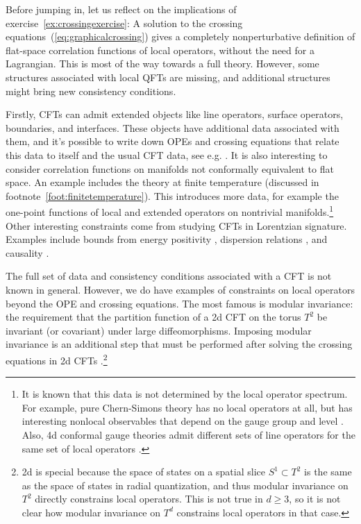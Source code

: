 \documentclass{ws-rv9x6}
\newcommand\<\langle
\renewcommand\>\rangle
\renewcommand\.{\cdot}
\begin{document}
Before jumping in, let us reflect on the implications of exercise~\ref{ex:crossingexercise}:  A solution to the crossing equations~(\ref{eq:graphicalcrossing}) gives a completely nonperturbative definition of flat-space correlation functions of local operators, without the need for a Lagrangian.  This is most of the way towards a full theory. However, some structures associated with local QFTs are missing, and additional structures might bring new consistency conditions.

Firstly, CFTs can admit extended objects like line operators, surface operators, boundaries, and interfaces. These objects have additional data associated with them, and it's possible to write down OPEs and crossing equations that relate this data to itself and the usual CFT data, see e.g. \cite{Liendo:2012hy,Gaiotto:2013nva}.  It is also interesting to consider correlation functions on manifolds not conformally equivalent to flat space. An example includes the theory at finite temperature (discussed in footnote~\ref{foot:finitetemperature}). This introduces more data, for example the one-point functions of local and extended operators on nontrivial manifolds.\footnote{It is known that this data is not determined by the local operator spectrum.  For example, pure Chern-Simons theory has no local operators at all, but has interesting nonlocal observables that depend on the gauge group and level \cite{Witten:1988hf}.  Also, 4d conformal gauge theories admit different sets of line operators for the same set of local operators \cite{Aharony:2013hda}.} Other interesting constraints come from studying CFTs in Lorentzian signature. Examples include bounds from energy positivity \cite{Hofman:2008ar}, dispersion relations \cite{Komargodski:2011vj,Nachtmann:1973mr,Komargodski:2012ek,Komargodski:2016gci}, and causality \cite{Maldacena:2015waa,Hartman:2015lfa}.

The full set of data and consistency conditions associated with a CFT is not known in general. However, we do have examples of constraints on local operators beyond the OPE and crossing equations. The most famous is modular invariance: the requirement that the partition function of a 2d CFT on the torus $T^2$ be invariant (or covariant) under large diffeomorphisms.  Imposing modular invariance is an additional step that must be performed after solving the crossing equations in 2d CFTs \cite{Moore:1988uz}.\footnote{2d is special because the space of states on a spatial slice $S^1\subset T^2$ is the same as the space of states in radial quantization, and thus modular invariance on $T^2$ directly constrains local operators.  This is not true in $d\geq 3$, so it is not clear how modular invariance on $T^d$ constrains local operators in that case.}
\end{document}
